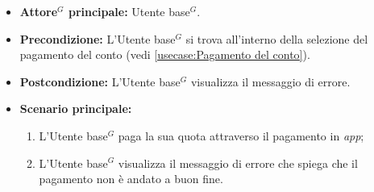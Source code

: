 \label{usecase:Visualizzazione errore pagamento}
\begin{itemize}
	\item \textbf{\gls{Attore}$^G$ principale:} \gls{Utente base}$^G$.

	\item \textbf{Precondizione:}
	      L'\gls{Utente base}$^G$ si trova all'interno della selezione del pagamento del conto (vedi \autoref{usecase:Pagamento del conto}).

	\item \textbf{Postcondizione:}
	      L'\gls{Utente base}$^G$ visualizza il messaggio di errore.

	\item \textbf{Scenario principale:}
	      \begin{enumerate}
		      \item L'\gls{Utente base}$^G$ paga la sua quota attraverso il pagamento in \textit{app};
		      \item L'\gls{Utente base}$^G$ visualizza il messaggio di errore che spiega che il pagamento non è andato a buon fine.
	      \end{enumerate}
\end{itemize}
